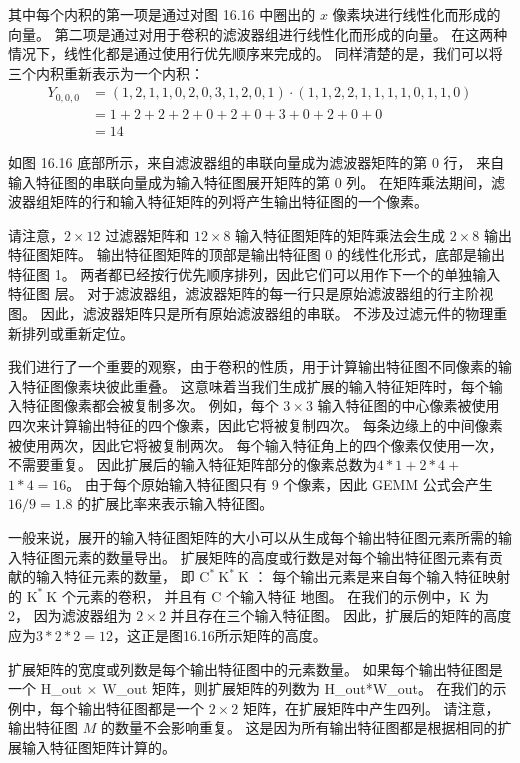 其中每个内积的第一项是通过对图 16.16 中圈出的 $x$ 像素块进行线性化而形成的向量。 
第二项是通过对用于卷积的滤波器组进行线性化而形成的向量。 在这两种情况下，线性化都是通过使用行优先顺序来完成的。 
同样清楚的是，我们可以将三个内积重新表示为一个内积：
$$
\begin{aligned}
Y_{0,0,0} & =(1,2,1,1,0,2,0,3,1,2,0,1) \cdot(1,1,2,2,1,1, 1,1,0,1,1,0) \\
& =1+2+2+2+0+2+0+3+0+2+0+0 \\
&=14
\end{aligned}
$$

如图 16.16 底部所示，来自滤波器组的串联向量成为滤波器矩阵的第 0 行，
来自输入特征图的串联向量成为输入特征图展开矩阵的第 0 列。 
在矩阵乘法期间，滤波器组矩阵的行和输入特征矩阵的列将产生输出特征图的一个像素。

请注意，$2 \times 12$ 过滤器矩阵和 $12 \times 8$ 输入特征图矩阵的矩阵乘法会生成 $2 \times 8$ 输出特征图矩阵。 
输出特征图矩阵的顶部是输出特征图 0 的线性化形式，底部是输出特征图 1。
两者都已经按行优先顺序排列，因此它们可以用作下一个的单独输入特征图 层。 
对于滤波器组，滤波器矩阵的每一行只是原始滤波器组的行主阶视图。 
因此，滤波器矩阵只是所有原始滤波器组的串联。 不涉及过滤元件的物理重新排列或重新定位。

我们进行了一个重要的观察，由于卷积的性质，用于计算输出特征图不同像素的输入特征图像素块彼此重叠。 
这意味着当我们生成扩展的输入特征矩阵时，每个输入特征图像素都会被复制多次。 
例如，每个 $3 \times 3$ 输入特征图的中心像素被使用四次来计算输出特征的四个像素，因此它将被复制四次。 
每条边缘上的中间像素被使用两次，因此它将被复制两次。 每个输入特征角上的四个像素仅使用一次，不需要重复。 
因此扩展后的输入特征矩阵部分的像素总数为$4 * 1+2 * 4+$ $1 * 4=16$。 
由于每个原始输入特征图只有 9 个像素，因此 GEMM 公式会产生 $16 / 9=1.8$ 的扩展比率来表示输入特征图。

一般来说，展开的输入特征图矩阵的大小可以从生成每个输出特征图元素所需的输入特征图元素的数量导出。 
扩展矩阵的高度或行数是对每个输出特征图元素有贡献的输入特征元素的数量，
即 $\mathrm{C}^{*} \mathrm{~K}^{*} \mathrm{~K}$ ：
每个输出元素是来自每个输入特征映射的 $\mathrm{K}^{*} \mathrm{~K}$ 个元素的卷积，
并且有 $\mathrm{C}$ 个输入特征 地图。 在我们的示例中，$\mathrm{K}$ 为 2，
因为滤波器组为 $2 \times 2$ 并且存在三个输入特征图。 
因此，扩展后的矩阵的高度应为$3 * 2 * 2=12$，这正是图16.16所示矩阵的高度。

扩展矩阵的宽度或列数是每个输出特征图中的元素数量。 
如果每个输出特征图是一个 H\_out $\times$ W\_out 矩阵，则扩展矩阵的列数为 H\_out*W\_out。 
在我们的示例中，每个输出特征图都是一个 $2 \times 2$ 矩阵，在扩展矩阵中产生四列。 
请注意，输出特征图 $M$ 的数量不会影响重复。 这是因为所有输出特征图都是根据相同的扩展输入特征图矩阵计算的。

